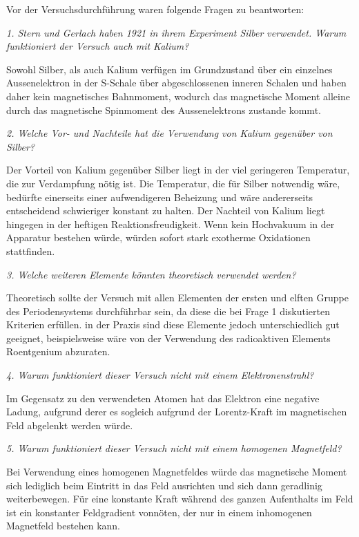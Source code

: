 \documentclass[a4paper,parskip,11pt, DIV12]{scrreprt}
\begin{document}
 Vor der Versuchsdurchführung waren folgende Fragen zu beantworten:
 
 \textit{1. Stern und Gerlach haben 1921 in ihrem Experiment Silber verwendet. Warum funktioniert der
Versuch auch mit Kalium?}

Sowohl Silber, als auch Kalium verfügen im Grundzustand über ein einzelnes Aussenelektron in der S-Schale über abgeschlossenen inneren Schalen und haben daher kein magnetisches Bahnmoment, wodurch das magnetische Moment alleine durch das magnetische Spinmoment des Aussenelektrons zustande kommt.

\textit{2. Welche Vor- und Nachteile hat die Verwendung von Kalium gegenüber von Silber?}

Der Vorteil von Kalium gegenüber Silber liegt in der viel geringeren Temperatur, die zur Verdampfung nötig ist. Die Temperatur, die für Silber notwendig wäre, bedürfte einerseits einer aufwendigeren Beheizung und wäre andererseits entscheidend schwieriger konstant zu halten. Der Nachteil von Kalium liegt hingegen in der heftigen Reaktionsfreudigkeit. Wenn kein Hochvakuum in der Apparatur bestehen würde, würden sofort stark exotherme Oxidationen stattfinden.

\textit{3. Welche weiteren Elemente könnten theoretisch verwendet werden?}

Theoretisch sollte der Versuch mit allen Elementen der ersten und elften Gruppe des Periodensystems durchführbar sein, da diese die bei Frage 1 diskutierten Kriterien erfüllen. in der Praxis sind diese Elemente jedoch unterschiedlich gut geeignet, beispielsweise wäre von der Verwendung des radioaktiven Elements Roentgenium abzuraten.

\textit{4. Warum funktioniert dieser Versuch nicht mit einem Elektronenstrahl?}

Im Gegensatz zu den verwendeten Atomen hat das Elektron eine negative Ladung, aufgrund derer es sogleich aufgrund der Lorentz-Kraft im magnetischen Feld abgelenkt werden würde.

\textit{5. Warum funktioniert dieser Versuch nicht mit einem homogenen Magnetfeld?}

Bei Verwendung eines homogenen Magnetfeldes würde das magnetische Moment sich lediglich beim Eintritt in das Feld ausrichten und sich dann geradlinig weiterbewegen. Für eine konstante Kraft während des ganzen Aufenthalts im Feld ist ein konstanter Feldgradient vonnöten, der nur in einem inhomogenen Magnetfeld bestehen kann.
\end{document}
